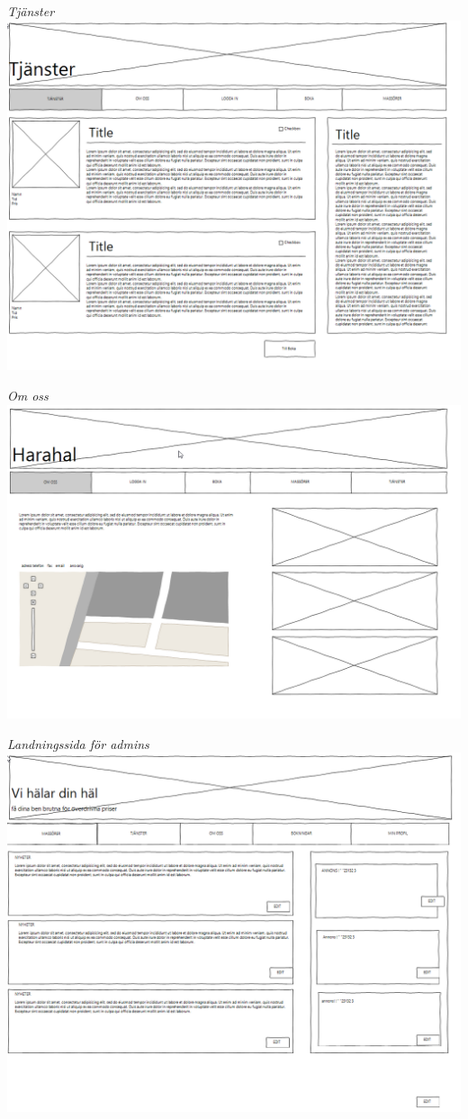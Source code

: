 \documentclass[11pt, titlepage, oneside, a4paper]{article}	%
\begin{document}
\begin{center}
    \textit{Tjänster}
    \includegraphics[width=1\textwidth]{../Bilder/Wireframe/tjanster}
    \newpage
    
    \textit{Om oss}
    \includegraphics[width=1\textwidth]{../Bilder/Wireframe/om_oss}
    
    \textit{Landningssida för admins}
    \includegraphics[width=1\textwidth]{../Bilder/Wireframe/a_hem}
    \newpage
    

\end{center}
\end{document}
